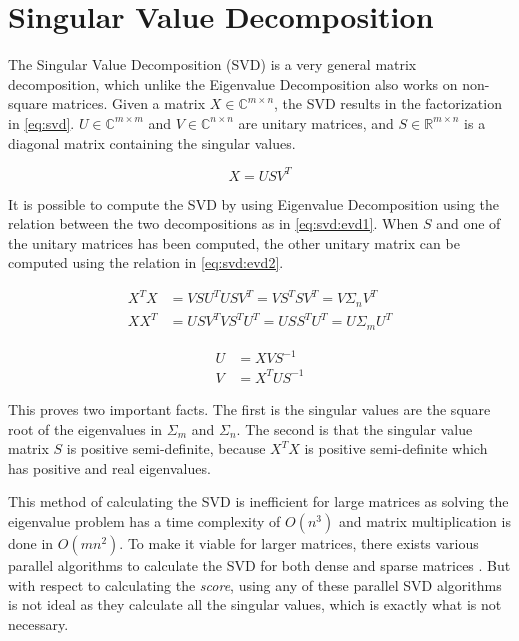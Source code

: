 \section{Singular Value Decomposition}

The Singular Value Decomposition (SVD) is a very general matrix decomposition, which unlike the Eigenvalue Decomposition also works on non-square matrices. Given a matrix $X \in \mathbb{C}^{m \times n}$, the SVD results in the factorization in \eqref{eq:svd}. $U \in \mathbb{C}^{m \times m}$ and $V \in \mathbb{C}^{n \times n}$ are unitary matrices, and $S \in \mathbb{R}^{m \times n}$ is a diagonal matrix containing the singular values.

\begin{equation} \label{eq:svd}
    X = USV^T
\end{equation}

It is possible to compute the SVD by using Eigenvalue Decomposition using the relation between the two decompositions as in \eqref{eq:svd:evd1}. When $S$ and one of the unitary matrices has been computed, the other unitary matrix can be computed using the relation in \eqref{eq:svd:evd2}.
 
\begin{equation} \label{eq:svd:evd1}
\begin{split} 
    X^T X &= VSU^T USV^T = VS^T SV^T = V \Sigma_n V^T \\
    X X^T &= USV^T VS^TU^T = US S^TU^T = U \Sigma_m U^T
\end{split}
\end{equation}

\begin{equation} \label{eq:svd:evd2}
\begin{split} 
    U &= X V S^{-1} \\
    V &= X^T U S^{-1}
\end{split}
\end{equation}

This proves two important facts. The first is the singular values are the square root of the eigenvalues in $\Sigma_m$ and $\Sigma_n$. The second is that the singular value matrix $S$ is positive semi-definite, because $X^T X$ is positive semi-definite which has positive and real eigenvalues.

This method of calculating the SVD is inefficient for large matrices as solving the eigenvalue problem has a time complexity of $O(n^3)$ and matrix multiplication is done in $O(mn^2)$. To make it viable for larger matrices, there exists various parallel algorithms to calculate the SVD for both dense and sparse matrices \cite[Chapter~4]{erricos:handbook}. But with respect to calculating the \textit{score}, using any of these parallel SVD algorithms is not ideal as they calculate all the singular values, which is exactly what is not necessary.

